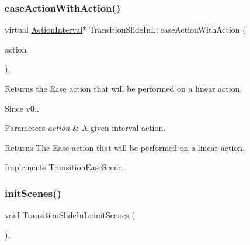 \mbox{\label{classTransitionSlideInL_a2f3669a542e5cfe1c56a86626f222039}} 
\subsubsection{\texorpdfstring{ease\+Action\+With\+Action()}{easeActionWithAction()}\hspace{0.1cm}{\footnotesize\ttfamily [2/2]}}
{\footnotesize\ttfamily virtual \hyperlink{classActionInterval}{Action\+Interval}$\ast$ Transition\+Slide\+In\+L\+::ease\+Action\+With\+Action (\begin{DoxyParamCaption}\item[{\hyperlink{classActionInterval}{Action\+Interval} $\ast$}]{action }\end{DoxyParamCaption})\hspace{0.3cm}{\ttfamily [override]}, {\ttfamily [virtual]}}

Returns the Ease action that will be performed on a linear action. \begin{DoxySince}{Since}
v0..
\end{DoxySince}

\begin{DoxyParams}{Parameters}
{\em action} & A given interval action. \\
\hline
\end{DoxyParams}
\begin{DoxyReturn}{Returns}
The Ease action that will be performed on a linear action. 
\end{DoxyReturn}


Implements \hyperlink{classTransitionEaseScene_a6f27540600b0d703ed30adc8976e65df}{Transition\+Ease\+Scene}.

\mbox{\label{classTransitionSlideInL_abac332ac289d8ed399168d7a428be3b7}} 
\subsubsection{\texorpdfstring{init\+Scenes()}{initScenes()}\hspace{0.1cm}{\footnotesize\ttfamily [1/2]}}
{\footnotesize\ttfamily void Transition\+Slide\+In\+L\+::init\+Scenes (\begin{DoxyParamCaption}\item[{void}]{ }\end{DoxyParamCaption})\hspace{0.3cm}{\ttfamily [protected]}, {\ttfamily [virtual]}}

